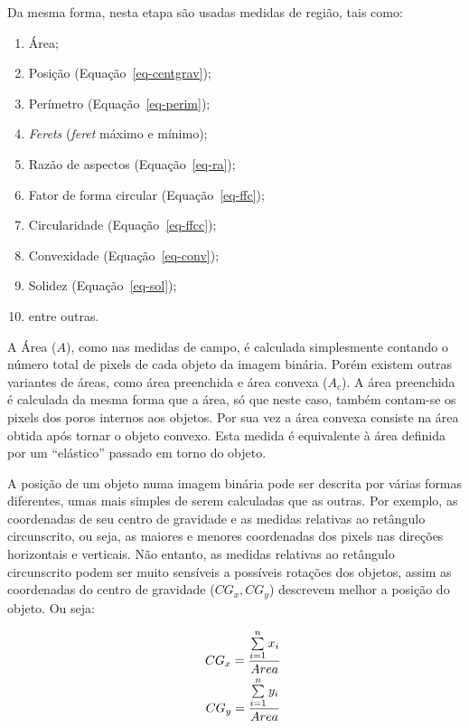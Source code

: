 Da mesma forma, nesta etapa são usadas medidas de região, tais como:
\begin{enumerate}[label=$\triangleright$]
  \item Área;
  \item Posição (Equação~\eqref{eq-centgrav});
  \item Perímetro (Equação~\eqref{eq-perim});
  \item \textit{Ferets} (\textit{feret} máximo e mínimo);
  \item Razão de aspectos (Equação~\eqref{eq-ra});
  \item Fator de forma circular (Equação~\eqref{eq-ffc});
  \item Circularidade (Equação~\eqref{eq-ffcc});
  \item Convexidade (Equação~\eqref{eq-conv});
  \item Solidez (Equação~\eqref{eq-sol}); 
  \item entre outras.
\end{enumerate}

A Área ($A$), como nas medidas de campo, é calculada simplesmente
contando o número total de pixels de cada objeto da imagem
binária. Porém existem outras variantes de áreas, como área preenchida
e área convexa ($A_c$). A área preenchida é calculada da mesma forma
que a área, só que neste caso, também contam-se os pixels dos poros
internos aos objetos. Por sua vez a área convexa consiste na área
obtida após tornar o objeto convexo. Esta medida é equivalente à área
definida por um ``elástico'' passado em torno do objeto.

A posição de um objeto numa imagem binária pode ser descrita por
várias formas diferentes, umas mais simples de serem calculadas que as
outras. Por exemplo, as coordenadas de seu centro de gravidade e as
medidas relativas ao retângulo circunscrito, ou seja, as maiores e
menores coordenadas dos pixels nas direções horizontais e
verticais. Não entanto, as medidas relativas ao retângulo circunscrito
podem ser muito sensíveis a possíveis rotações dos objetos, assim as
coordenadas do centro de gravidade ($CG_x,CG_y$) descrevem melhor a
posição do objeto.\cite{114} Ou seja:

\begin{align}\label{eq-centgrav}
 \begin{array}{c c c}
  &CG_x=\dfrac{\sum\limits_{i=1}^n{x_i}}{Area}\\
  ~\\[-3mm]
  &CG_y=\dfrac{\sum\limits_{i=1}^n{y_i}}{Area}
 \end{array}
\end{align}

